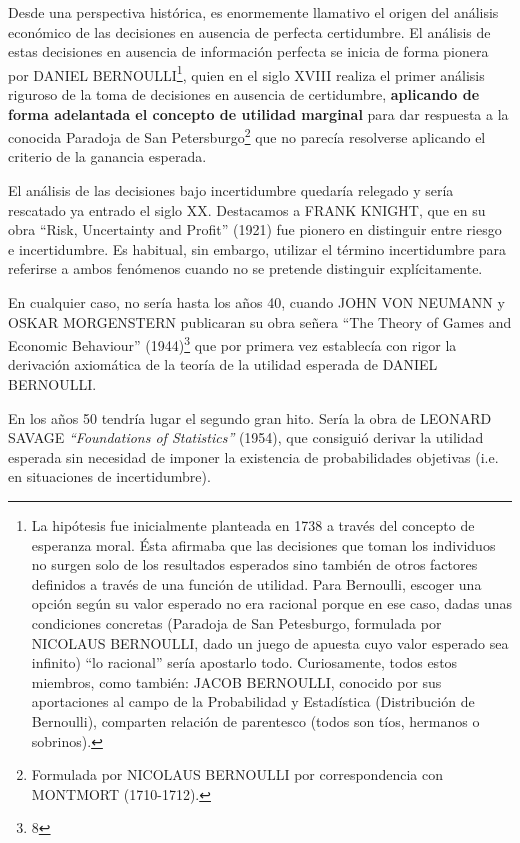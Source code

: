 \documentclass[10pt,a4paper]{article}
\begin{document}
Desde una perspectiva histórica, es enormemente llamativo el origen del análisis económico de las decisiones en ausencia de perfecta certidumbre. El análisis de estas decisiones en ausencia de información perfecta se inicia de forma pionera por DANIEL BERNOULLI\footnote{%
    La hipótesis fue inicialmente planteada en 1738 a través del concepto de esperanza moral. Ésta afirmaba que las decisiones que toman los individuos no surgen solo de los resultados esperados sino también de otros factores definidos a través de una función de utilidad. Para Bernoulli, escoger una opción según su valor esperado no era racional porque en ese caso, dadas unas condiciones concretas (Paradoja de San Petesburgo, formulada por NICOLAUS BERNOULLI, dado un juego de apuesta cuyo valor esperado sea infinito) “lo racional” sería apostarlo todo. Curiosamente, todos estos miembros, como también: JACOB BERNOULLI, conocido por sus aportaciones al campo de la Probabilidad y Estadística (Distribución de Bernoulli), comparten relación de parentesco (todos son tíos, hermanos o sobrinos).
}, quien en el siglo XVIII realiza el primer análisis riguroso de la toma de decisiones en ausencia de certidumbre, \textbf{aplicando de forma adelantada el concepto de utilidad marginal} para dar respuesta a la conocida Paradoja de San Petersburgo\footnote{Formulada por NICOLAUS BERNOULLI por correspondencia con MONTMORT (1710-1712).} que no parecía resolverse aplicando el criterio de la ganancia esperada.

El análisis de las decisiones bajo incertidumbre quedaría relegado y sería rescatado ya entrado el siglo XX. Destacamos a FRANK KNIGHT, que en su obra “Risk, Uncertainty and Profit” (1921) fue pionero en distinguir entre riesgo e incertidumbre. Es habitual, sin embargo, utilizar el término incertidumbre para referirse a ambos fenómenos cuando no se pretende distinguir explícitamente.

En cualquier caso, no sería hasta los años 40, cuando JOHN VON NEUMANN y OSKAR MORGENSTERN publicaran su obra señera “The Theory of Games and Economic Behaviour” (1944)\footnote{8} que por primera vez establecía con rigor la derivación axiomática de la teoría de la utilidad esperada de DANIEL BERNOULLI.

En los años 50 tendría lugar el segundo gran hito. Sería la obra de LEONARD SAVAGE \textit{“Foundations of Statistics”} (1954), que consiguió derivar la utilidad esperada sin necesidad de imponer la existencia de probabilidades objetivas (i.e. en situaciones de incertidumbre).
\end{document}
